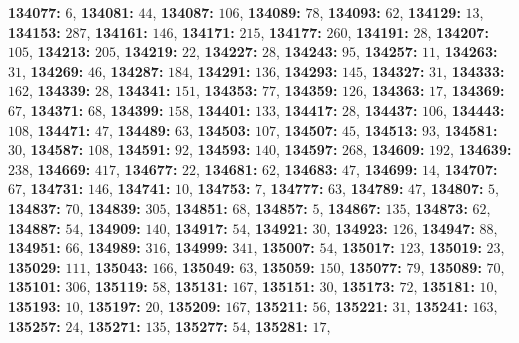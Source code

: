 \textsf{\bfseries 134077:} $6$, \textsf{\bfseries 134081:} $44$, \textsf{\bfseries 134087:} $106$, \textsf{\bfseries 134089:} $78$, \textsf{\bfseries 134093:} $62$, \textsf{\bfseries 134129:} $13$, \textsf{\bfseries 134153:} $287$, \textsf{\bfseries 134161:} $146$, \textsf{\bfseries 134171:} $215$, \textsf{\bfseries 134177:} $260$, \textsf{\bfseries 134191:} $28$, \textsf{\bfseries 134207:} $105$, \textsf{\bfseries 134213:} $205$, \textsf{\bfseries 134219:} $22$, \textsf{\bfseries 134227:} $28$, \textsf{\bfseries 134243:} $95$, \textsf{\bfseries 134257:} $11$, \textsf{\bfseries 134263:} $31$, \textsf{\bfseries 134269:} $46$, \textsf{\bfseries 134287:} $184$, \textsf{\bfseries 134291:} $136$, \textsf{\bfseries 134293:} $145$, \textsf{\bfseries 134327:} $31$, \textsf{\bfseries 134333:} $162$, \textsf{\bfseries 134339:} $28$, \textsf{\bfseries 134341:} $151$, \textsf{\bfseries 134353:} $77$, \textsf{\bfseries 134359:} $126$, \textsf{\bfseries 134363:} $17$, \textsf{\bfseries 134369:} $67$, \textsf{\bfseries 134371:} $68$, \textsf{\bfseries 134399:} $158$, \textsf{\bfseries 134401:} $133$, \textsf{\bfseries 134417:} $28$, \textsf{\bfseries 134437:} $106$, \textsf{\bfseries 134443:} $108$, \textsf{\bfseries 134471:} $47$, \textsf{\bfseries 134489:} $63$, \textsf{\bfseries 134503:} $107$, \textsf{\bfseries 134507:} $45$, \textsf{\bfseries 134513:} $93$, \textsf{\bfseries 134581:} $30$, \textsf{\bfseries 134587:} $108$, \textsf{\bfseries 134591:} $92$, \textsf{\bfseries 134593:} $140$, \textsf{\bfseries 134597:} $268$, \textsf{\bfseries 134609:} $192$, \textsf{\bfseries 134639:} $238$, \textsf{\bfseries 134669:} $417$, \textsf{\bfseries 134677:} $22$, \textsf{\bfseries 134681:} $62$, \textsf{\bfseries 134683:} $47$, \textsf{\bfseries 134699:} $14$, \textsf{\bfseries 134707:} $67$, \textsf{\bfseries 134731:} $146$, \textsf{\bfseries 134741:} $10$, \textsf{\bfseries 134753:} $7$, \textsf{\bfseries 134777:} $63$, \textsf{\bfseries 134789:} $47$, \textsf{\bfseries 134807:} $5$, \textsf{\bfseries 134837:} $70$, \textsf{\bfseries 134839:} $305$, \textsf{\bfseries 134851:} $68$, \textsf{\bfseries 134857:} $5$, \textsf{\bfseries 134867:} $135$, \textsf{\bfseries 134873:} $62$, \textsf{\bfseries 134887:} $54$, \textsf{\bfseries 134909:} $140$, \textsf{\bfseries 134917:} $54$, \textsf{\bfseries 134921:} $30$, \textsf{\bfseries 134923:} $126$, \textsf{\bfseries 134947:} $88$, \textsf{\bfseries 134951:} $66$, \textsf{\bfseries 134989:} $316$, \textsf{\bfseries 134999:} $341$, \textsf{\bfseries 135007:} $54$, \textsf{\bfseries 135017:} $123$, \textsf{\bfseries 135019:} $23$, \textsf{\bfseries 135029:} $111$, \textsf{\bfseries 135043:} $166$, \textsf{\bfseries 135049:} $63$, \textsf{\bfseries 135059:} $150$, \textsf{\bfseries 135077:} $79$, \textsf{\bfseries 135089:} $70$, \textsf{\bfseries 135101:} $306$, \textsf{\bfseries 135119:} $58$, \textsf{\bfseries 135131:} $167$, \textsf{\bfseries 135151:} $30$, \textsf{\bfseries 135173:} $72$, \textsf{\bfseries 135181:} $10$, \textsf{\bfseries 135193:} $10$, \textsf{\bfseries 135197:} $20$, \textsf{\bfseries 135209:} $167$, \textsf{\bfseries 135211:} $56$, \textsf{\bfseries 135221:} $31$, \textsf{\bfseries 135241:} $163$, \textsf{\bfseries 135257:} $24$, \textsf{\bfseries 135271:} $135$, \textsf{\bfseries 135277:} $54$, \textsf{\bfseries 135281:} $17$, 
